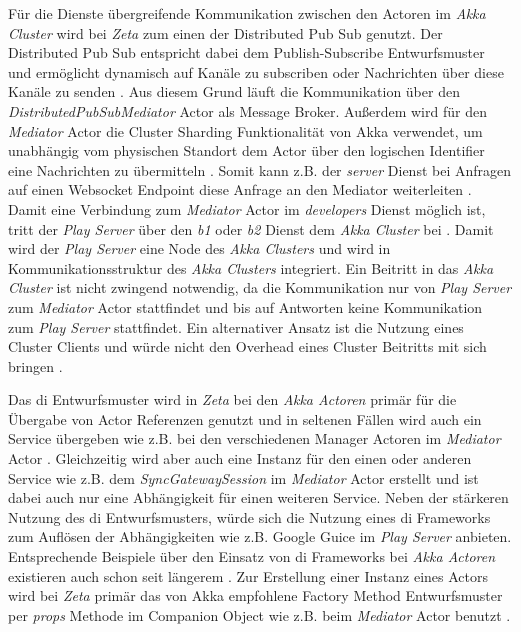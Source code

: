 Für die Dienste übergreifende Kommunikation zwischen den Actoren im \textit{Akka Cluster} wird bei \textit{Zeta} zum einen der Distributed Pub Sub genutzt. Der Distributed Pub Sub entspricht dabei dem Publish-Subscribe Entwurfsmuster und ermöglicht dynamisch auf Kanäle zu subscriben oder Nachrichten über diese Kanäle zu senden \cite{subcribe_publish_pattern}. Aus diesem Grund läuft die Kommunikation über den \textit{DistributedPubSubMediator} Actor als Message Broker. Außerdem wird für den \textit{Mediator} Actor die Cluster Sharding Funktionalität von Akka verwendet, um  unabhängig vom physischen Standort dem Actor über den logischen Identifier eine Nachrichten zu übermitteln \cite{akka_cluster_sharding}. Somit kann z.B. der \textit{server} Dienst bei Anfragen auf einen Websocket Endpoint diese Anfrage an den Mediator weiterleiten \cite{zeta_server_to_mediator}. Damit eine Verbindung zum \textit{Mediator} Actor im \textit{developers} Dienst möglich ist, tritt der \textit{Play Server} über den \textit{b1} oder \textit{b2} Dienst dem \textit{Akka Cluster} bei \cite{zeta_docker_play_seeds}. Damit wird der \textit{Play Server} eine Node des \textit{Akka Clusters} und wird in Kommunikationsstruktur des \textit{Akka Clusters} integriert. Ein Beitritt in das \textit{Akka Cluster} ist nicht zwingend notwendig, da die Kommunikation nur von \textit{Play Server} zum \textit{Mediator} Actor stattfindet und bis auf Antworten keine Kommunikation zum \textit{Play Server} stattfindet. Ein alternativer Ansatz ist die Nutzung eines Cluster Clients und würde nicht den Overhead eines Cluster Beitritts mit sich bringen \cite{akka_cluster_client}.

Das \ac{di} Entwurfsmuster wird in \textit{Zeta} bei den \textit{Akka Actoren} primär für die Übergabe von Actor Referenzen genutzt und in seltenen Fällen wird auch ein Service übergeben wie z.B. bei den verschiedenen Manager Actoren im \textit{Mediator} Actor \cite{zeta_mediator}. Gleichzeitig wird aber auch eine Instanz für den einen oder anderen Service wie z.B. dem \textit{SyncGatewaySession} im \textit{Mediator} Actor erstellt und ist dabei auch nur eine Abhängigkeit für einen weiteren Service. Neben der stärkeren Nutzung des \ac{di} Entwurfsmusters, würde sich die Nutzung eines \ac{di} Frameworks zum Auflösen der Abhängigkeiten wie z.B. Google Guice im \textit{Play Server} anbieten. Entsprechende Beispiele über den Einsatz von \ac{di} Frameworks bei \textit{Akka Actoren} existieren auch schon seit längerem \cite{akka_actor_di}. Zur Erstellung einer Instanz eines Actors wird bei \textit{Zeta} primär das von Akka empfohlene Factory Method Entwurfsmuster per \textit{props} Methode im Companion Object wie z.B. beim \textit{Mediator} Actor benutzt \cite{scala_companion_object}.


